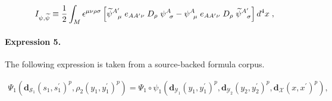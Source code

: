 \documentclass[11pt]{article}
\begin{document}
\begin{align*}I_{\psi,{\widetilde \psi}} \equiv {1\over 2}\int_{M} \epsilon^{\mu \nu \rho \sigma} \left[{\widetilde \psi}_{\; \; \; \mu}^{A'} \;e_{AA' \nu} \; D_{\rho} \; \psi_{\; \; \sigma}^{A}-\psi_{\; \; \mu}^{A} \; e_{AA' \nu} \; D_{\rho} \;{\widetilde \psi}_{\; \; \; \sigma}^{A'} \right] d^{4}x \; ,\end{align*}

\paragraph{Expression 5.} The following expression is taken from a source-backed formula corpus.

\begin{align*}\Psi_1 \left( \boldsymbol{d}_{\mathcal{S}_1}(s_1, s_1^\prime)^p, \rho_2(y_1, y_1^\prime)^{p} \right) = \Psi_1 \circ \psi_1 \left( \boldsymbol{d}_{\mathcal{Y}_1}(y_1, y_1^\prime)^{p} , \boldsymbol{d}_{\mathcal{Y}_2} (y_2, y_2^\prime )^p , \boldsymbol{d}_{\mathcal{X}}(x, x^\prime)^p \right), \end{align*}
\end{document}
